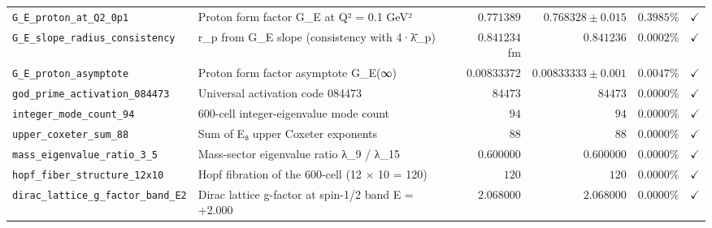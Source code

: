 \begin{table}[htbp]
\begin{tabular}{llrrrc}
\texttt{G\_E\_proton\_at\_Q2\_0p1} & Proton form factor G\_E at Q² = 0.1 GeV² & $0.771389$ & $0.768328 \pm 0.015$ & $0.3985\%$ & $\checkmark$ \\
\texttt{G\_E\_slope\_radius\_consistency} & r\_p from G\_E slope (consistency with 4·λ̄\_p) & $0.841234$ fm & $0.841236$ & $0.0002\%$ & $\checkmark$ \\
\texttt{G\_E\_proton\_asymptote} & Proton form factor asymptote G\_E(∞) & $0.00833372$ & $0.00833333 \pm 0.001$ & $0.0047\%$ & $\checkmark$ \\
\texttt{god\_prime\_activation\_084473} & Universal activation code 084473 & $84473$ & $84473$ & $0.0000\%$ & $\checkmark$ \\
\texttt{integer\_mode\_count\_94} & 600-cell integer-eigenvalue mode count & $94$ & $94$ & $0.0000\%$ & $\checkmark$ \\
\texttt{upper\_coxeter\_sum\_88} & Sum of E₈ upper Coxeter exponents & $88$ & $88$ & $0.0000\%$ & $\checkmark$ \\
\texttt{mass\_eigenvalue\_ratio\_3\_5} & Mass-sector eigenvalue ratio λ\_9 / λ\_15 & $0.600000$ & $0.600000$ & $0.0000\%$ & $\checkmark$ \\
\texttt{hopf\_fiber\_structure\_12x10} & Hopf fibration of the 600-cell (12 × 10 = 120) & $120$ & $120$ & $0.0000\%$ & $\checkmark$ \\
\texttt{dirac\_lattice\_g\_factor\_band\_E2} & Dirac lattice g-factor at spin-1/2 band E = +2.000 & $2.068000$ & $2.068000$ & $0.0000\%$ & $\checkmark$ \\
\bottomrule
\end{tabular}
\end{table}
